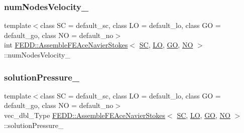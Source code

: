 \mbox{\label{classFEDD_1_1AssembleFEAceNavierStokes_a3a8035f008772690f30636987062d2f9}} 
\subsubsection{\texorpdfstring{num\+Nodes\+Velocity\+\_\+}{numNodesVelocity\_}}
{\footnotesize\ttfamily template$<$class SC  = default\+\_\+sc, class LO  = default\+\_\+lo, class GO  = default\+\_\+go, class NO  = default\+\_\+no$>$ \\
int \hyperlink{classFEDD_1_1AssembleFEAceNavierStokes}{F\+E\+D\+D\+::\+Assemble\+F\+E\+Ace\+Navier\+Stokes}$<$ \hyperlink{fe__test__laplace_8cpp_a79c7e86a57edbb2a5a53242bcd04e41e}{SC}, \hyperlink{fe__test__laplace_8cpp_ad6a38c9f07d3fd633eefca5bccad8410}{LO}, \hyperlink{fe__test__laplace_8cpp_afa2946b509009b4f45eb04bd8c5b27d9}{GO}, \hyperlink{fe__test__laplace_8cpp_a5e24f37b28787429872b6ecb1d0417ce}{NO} $>$\+::num\+Nodes\+Velocity\+\_\+\hspace{0.3cm}{\ttfamily [private]}}

\mbox{\label{classFEDD_1_1AssembleFEAceNavierStokes_ab1e3da8b5d59c7a335906aa6415038ff}} 
\subsubsection{\texorpdfstring{solution\+Pressure\+\_\+}{solutionPressure\_}}
{\footnotesize\ttfamily template$<$class SC  = default\+\_\+sc, class LO  = default\+\_\+lo, class GO  = default\+\_\+go, class NO  = default\+\_\+no$>$ \\
vec\+\_\+dbl\+\_\+\+Type \hyperlink{classFEDD_1_1AssembleFEAceNavierStokes}{F\+E\+D\+D\+::\+Assemble\+F\+E\+Ace\+Navier\+Stokes}$<$ \hyperlink{fe__test__laplace_8cpp_a79c7e86a57edbb2a5a53242bcd04e41e}{SC}, \hyperlink{fe__test__laplace_8cpp_ad6a38c9f07d3fd633eefca5bccad8410}{LO}, \hyperlink{fe__test__laplace_8cpp_afa2946b509009b4f45eb04bd8c5b27d9}{GO}, \hyperlink{fe__test__laplace_8cpp_a5e24f37b28787429872b6ecb1d0417ce}{NO} $>$\+::solution\+Pressure\+\_\+\hspace{0.3cm}{\ttfamily [private]}}

